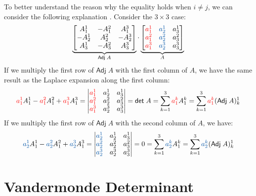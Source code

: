 \documentclass[
	11pt, %
	fleqn, %
	a4paper, %
]{LegrandOrangeBook}
\renewcommand{\det}{\mathsf{det\;}} %
\newcommand{\adj}{\mathsf{Adj\;}} %
\begin{document}
To better understand the reason why the equality holds when $i \neq j$, we can consider the following explanation \cite{1404250}. Consider the $3 \times 3$ case:
\[
    \underbrace{\begin{bmatrix}
        A_1^1 & -A_1^2 & A_1^3 \\
        -A_2^1 & A_2^2 & -A_2^3 \\
        A_3^1 & -A_3^2 & A_3^3
    \end{bmatrix}}_{\adj A} \cdot \underbrace{\begin{bmatrix}
        {\color{red} a_1^1} & {\color{ocre} a_2^1} & a_3^1 \\
        {\color{red} a_1^2} & {\color{ocre} a_2^2} & a_3^2 \\
        {\color{red} a_1^3} & {\color{ocre} a_2^3} & a_3^3
    \end{bmatrix}}_{A}
\]
If we multiply the first row of $\adj A$ with the first column of $A$, we have the same result as the Laplace expansion along the first column:
\[
    {\color{red} a_1^1} A_1^1 - {\color{red} a_1^2} A_1^2 + {\color{red} a_1^3} A_1^3 = \begin{vmatrix}
        {\color{red} a_1^1} & a_2^1 & a_3^1 \\
        {\color{red} a_1^2} & a_2^2 & a_3^2 \\
        {\color{red} a_1^3} & a_2^3 & a_3^3
    \end{vmatrix} = \det A = \sum_{k = 1}^3 {\color{red} a_1^k} A_1^k = \sum_{k = 1}^3 {\color{red} a_1^k} (\adj A)_k^1
\]
If we multiply the first row of $\adj A$ with the second column of $A$, we have:
\[
    {\color{ocre} a_2^1} A_1^1 - {\color{ocre} a_2^2} A_1^2 + {\color{ocre} a_2^3} A_1^3 = \begin{vmatrix}
        {\color{ocre} a_2^1} & a_2^1 & a_3^1 \\
        {\color{ocre} a_2^2} & a_2^2 & a_3^2 \\
        {\color{ocre} a_2^3} & a_2^3 & a_3^3
    \end{vmatrix} = 0 = \sum_{k = 1}^3 {\color{ocre} a_2^k} A_1^k = \sum_{k = 1}^3 {\color{ocre} a_2^k} (\adj A)_k^1
\]

\newpage

\section{Vandermonde Determinant}
\end{document}
